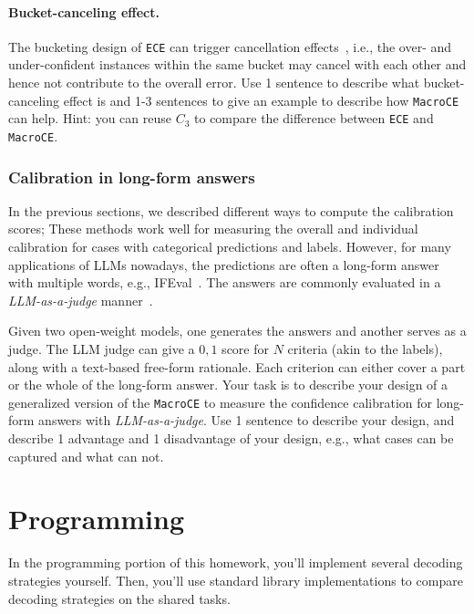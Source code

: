 \documentclass{article}
\begin{document}
\begin{solve}
\end{solve}

\paragraph{Bucket-canceling effect.} The bucketing design of \texttt{ECE} can trigger cancellation effects~\cite{si-etal-2022-examining}, i.e., the over- and under-confident instances within the same bucket may cancel with each other and hence not contribute to the overall error. Use 1 sentence to describe what bucket-canceling effect is and 1-3 sentences to give an example to describe how \texttt{MacroCE} can help. Hint: you can reuse $C_3$ to compare the difference between \texttt{ECE} and \texttt{MacroCE}.

\begin{solve}
\end{solve}

\subsubsection{Calibration in long-form answers}
In the previous sections, we described different ways to compute the calibration scores; These methods work well for measuring the overall and individual calibration for cases with categorical predictions and labels. However, for many applications of LLMs nowadays, the predictions are often a long-form answer with multiple words, e.g., IFEval~\cite{zhou2023instruction}. The answers are commonly evaluated in a \textit{LLM-as-a-judge} manner~\cite{zheng2023judging}.  

Given two open-weight models, one generates the answers and another serves as a judge. The LLM judge can give a $0,1$ score for $N$ criteria (akin to the labels), along with a text-based free-form rationale. Each criterion can either cover a part or the whole of the long-form answer.
Your task is to describe your design of a generalized version of the \texttt{MacroCE} to measure the confidence calibration for long-form answers with \textit{LLM-as-a-judge}. Use 1 sentence to describe your design, and describe 1 advantage and 1 disadvantage of your design, e.g., what cases can be captured and what can not. 

\begin{solve}
\end{solve}

\clearpage

\section{Programming}
In the programming portion of this homework, you'll implement several decoding strategies yourself. Then, you'll use standard library implementations to compare decoding strategies on the shared tasks.
\end{document}
